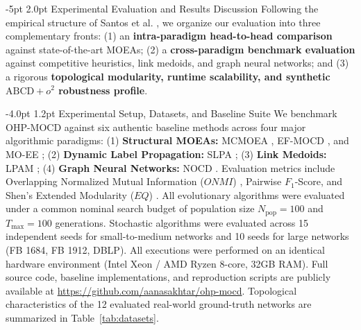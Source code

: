 \documentclass{svproc}
\makeatletter
\renewcommand\section{\@startsection{section}{1}{\z@}%
  {-5pt \@plus -1pt \@minus -0.5pt}%
  {2.0pt \@plus 0.5pt}%
  {\normalfont\large\bfseries\boldmath}}
\renewcommand\subsection{\@startsection{subsection}{2}{\z@}%
  {-4.0pt \@plus -0.5pt \@minus -0.5pt}%
  {1.2pt \@plus 0.5pt}%
  {\normalfont\normalsize\bfseries\boldmath}}
\makeatother
\begin{document}
\section{Experimental Evaluation and Results Discussion}\label{sec:experiments}
Following the empirical structure of Santos et al. \cite{santos2025}, we organize our evaluation into three complementary fronts: (1) an \textbf{intra-paradigm head-to-head comparison} against state-of-the-art MOEAs; (2) a \textbf{cross-paradigm benchmark evaluation} against competitive heuristics, link medoids, and graph neural networks; and (3) a rigorous \textbf{topological modularity, runtime scalability, and synthetic $\text{ABCD}+o^2$ robustness profile}.

\subsection{Experimental Setup, Datasets, and Baseline Suite}\label{subsec:setup}
We benchmark OHP-MOCD against six authentic baseline methods across four major algorithmic paradigms: (1) \textbf{Structural MOEAs:} MCMOEA \cite{wen2016}, EF-MOCD \cite{tian2020}, and MO-EE \cite{bello2018}; (2) \textbf{Dynamic Label Propagation:} SLPA \cite{xie2012}; (3) \textbf{Link Medoids:} LPAM \cite{ponomarenko2021}; (4) \textbf{Graph Neural Networks:} NOCD \cite{shchur2019}. Evaluation metrics include Overlapping Normalized Mutual Information ($ONMI$) \cite{lancichinetti2009onmi}, Pairwise $F_1$-Score, and Shen's Extended Modularity ($EQ$) \cite{shen2009,nicosia2009}. All evolutionary algorithms were evaluated under a common nominal search budget of population size $N_{\text{pop}} = 100$ and $T_{\text{max}} = 100$ generations. Stochastic algorithms were evaluated across 15 independent seeds for small-to-medium networks and 10 seeds for large networks (FB 1684, FB 1912, DBLP). All executions were performed on an identical hardware environment (Intel Xeon / AMD Ryzen 8-core, 32GB RAM). Full source code, baseline implementations, and reproduction scripts are publicly available at \url{https://github.com/aanasakhtar/ohp-mocd}. Topological characteristics of the 12 evaluated real-world ground-truth networks are summarized in Table~\ref{tab:datasets}.
\end{document}
